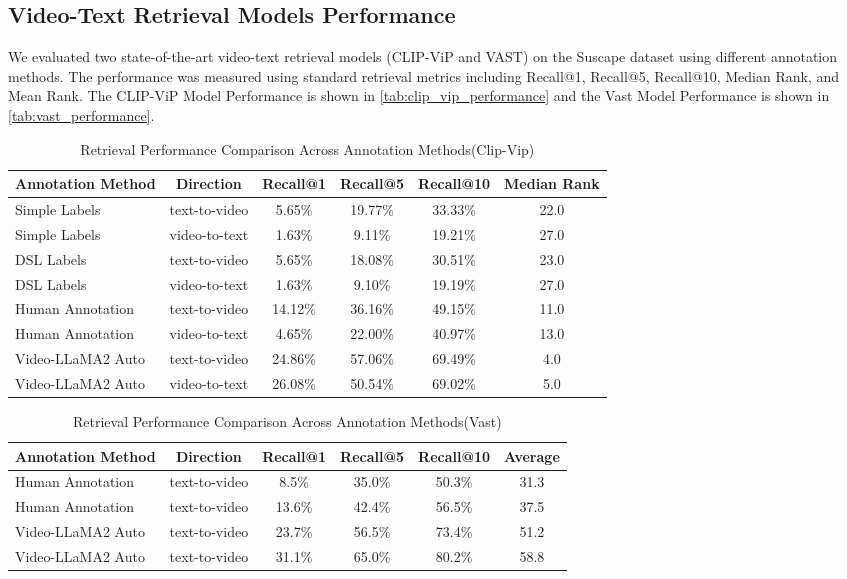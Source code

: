 \documentclass[lettersize,journal]{IEEEtran}
\begin{document}
\subsection{Video-Text Retrieval Models Performance}
We evaluated two state-of-the-art video-text retrieval models (CLIP-ViP and VAST) on the Suscape dataset using different annotation methods. The performance was measured using standard retrieval metrics including Recall@1, Recall@5, Recall@10, Median Rank, and Mean Rank. The CLIP-ViP Model Performance is shown in \autoref{tab:clip_vip_performance} and the Vast Model Performance is shown in \autoref{tab:vast_performance}.


\begin{table*}[htbp]
\centering

\caption{Retrieval Performance Comparison Across Annotation Methods(Clip-Vip)}
\label{tab:clip_vip_performance}
\begin{tabular}{lccccc}
\toprule
\textbf{Annotation Method} & \textbf{Direction} & \textbf{Recall@1} & \textbf{Recall@5} & \textbf{Recall@10} & \textbf{Median Rank} \\
\midrule
Simple Labels & text-to-video & 5.65\% & 19.77\% & 33.33\% & 22.0 \\
Simple Labels & video-to-text & 1.63\% & 9.11\% & 19.21\% & 27.0 \\
DSL Labels & text-to-video & 5.65\% & 18.08\% & 30.51\% & 23.0 \\
DSL Labels & video-to-text & 1.63\% & 9.10\% & 19.19\% & 27.0 \\
Human Annotation & text-to-video & 14.12\% & 36.16\% & 49.15\% & 11.0 \\
Human Annotation & video-to-text & 4.65\% & 22.00\% & 40.97\% & 13.0 \\
Video-LLaMA2 Auto & text-to-video & 24.86\% & 57.06\% & 69.49\% & 4.0 \\
Video-LLaMA2 Auto & video-to-text & 26.08\% & 50.54\% & 69.02\% & 5.0 \\
\bottomrule
\end{tabular}

\end{table*}

\begin{table*}[htbp]
\centering
\caption{Retrieval Performance Comparison Across Annotation Methods(Vast)}
\label{tab:vast_performance}
\begin{tabular}{lccccc}
\toprule
\textbf{Annotation Method} & \textbf{Direction} & \textbf{Recall@1} & \textbf{Recall@5} & \textbf{Recall@10} & \textbf{Average} \\
\midrule
Human Annotation & text-to-video & 8.5\% & 35.0\% & 50.3\% & 31.3 \\
Human Annotation & text-to-video & 13.6\% & 42.4\% & 56.5\% & 37.5 \\
Video-LLaMA2 Auto & text-to-video & 23.7\% & 56.5\% & 73.4\% & 51.2 \\
Video-LLaMA2 Auto & text-to-video & 31.1\% & 65.0\% & 80.2\% & 58.8 \\
\bottomrule
\end{tabular}
\end{table*}
\end{document}
